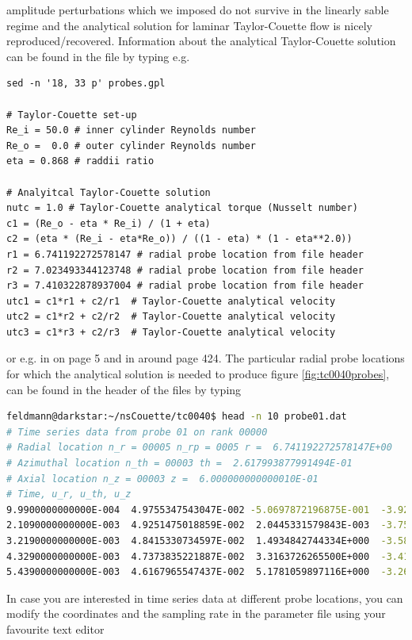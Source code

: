 \documentclass[a4paper, 11pt, DIV=11]{scrartcl}
\begin{document}
amplitude perturbations which we imposed do not survive in the linearly sable 
regime and the analytical solution for laminar Taylor-Couette flow is nicely 
reproduced/recovered. Information about the analytical Taylor-Couette solution can be 
found in the  file by typing e.g.
\begin{lstlisting}[language=Gnuplot]
sed -n '18, 33 p' probes.gpl 

# Taylor-Couette set-up
Re_i = 50.0 # inner cylinder Reynolds number
Re_o =  0.0 # outer cylinder Reynolds number
eta = 0.868 # raddii ratio

# Analyitcal Taylor-Couette solution
nutc = 1.0 # Taylor-Couette analytical torque (Nusselt number)
c1 = (Re_o - eta * Re_i) / (1 + eta)
c2 = (eta * (Re_i - eta*Re_o)) / ((1 - eta) * (1 - eta**2.0))
r1 = 6.741192272578147 # radial probe location from file header
r2 = 7.023493344123748 # radial probe location from file header
r3 = 7.410322878937004 # radial probe location from file header
utc1 = c1*r1 + c2/r1  # Taylor-Couette analytical velocity
utc2 = c1*r2 + c2/r2  # Taylor-Couette analytical velocity
utc3 = c1*r3 + c2/r3  # Taylor-Couette analytical velocity
\end{lstlisting}
or e.g. in \cite{Shi2015} on page \num{5} and in \cite{Brauckmann2016} around 
page \num{424}. The particular radial probe locations for which the analytical 
solution is needed to produce figure \ref{fig:tc0040probes}, can be found in the 
header of the  files by typing
\begin{lstlisting}[language=bash]
feldmann@darkstar:~/nsCouette/tc0040$ head -n 10 probe01.dat
# Time series data from probe 01 on rank 00000
# Radial location n_r = 00005 n_rp = 0005 r =  6.741192272578147E+00
# Azimuthal location n_th = 00003 th =  2.617993877991494E-01
# Axial location n_z = 00003 z =  6.000000000000010E-01
# Time, u_r, u_th, u_z 
9.9900000000000E-004  4.9755347543047E-002 -5.0697872196875E-001  -3.9262289916098E-001
2.1090000000000E-003  4.9251475018859E-002  2.0445331579843E-003  -3.7513595580142E-001
3.2190000000000E-003  4.8415330734597E-002  1.4934842744334E+000  -3.5808738661681E-001
4.3290000000000E-003  4.7373835221887E-002  3.3163726265500E+000  -3.4181516483879E-001
5.4390000000000E-003  4.6167965547437E-002  5.1781059897116E+000  -3.2637614051804E-001
\end{lstlisting}
In case you are interested in time series data at different probe locations, you 
can modify the coordinates and the sampling rate in the parameter file using 
your favourite text editor
\end{document}
